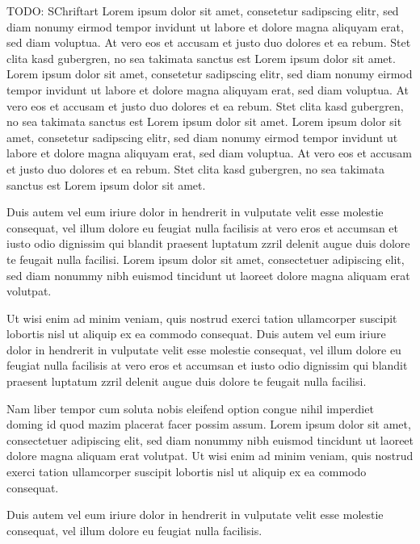 \documentclass[a4paper,
  ]{scrartcl}
\begin{document}


TODO: SChriftart
Lorem ipsum dolor sit amet, consetetur sadipscing elitr, sed diam nonumy eirmod tempor invidunt ut labore et dolore magna aliquyam erat, sed diam voluptua. At vero eos et accusam et justo duo dolores et ea rebum. Stet clita kasd gubergren, no sea takimata sanctus est Lorem ipsum dolor sit amet. Lorem ipsum dolor sit amet, consetetur sadipscing elitr, sed diam nonumy eirmod tempor invidunt ut labore et dolore magna aliquyam erat, sed diam voluptua. At vero eos et accusam et justo duo dolores et ea rebum. Stet clita kasd gubergren, no sea takimata sanctus est Lorem ipsum dolor sit amet. Lorem ipsum dolor sit amet, consetetur sadipscing elitr, sed diam nonumy eirmod tempor invidunt ut labore et dolore magna aliquyam erat, sed diam voluptua. At vero eos et accusam et justo duo dolores et ea rebum. Stet clita kasd gubergren, no sea takimata sanctus est Lorem ipsum dolor sit amet.

Duis autem vel eum iriure dolor in hendrerit in vulputate velit esse molestie consequat, vel illum dolore eu feugiat nulla facilisis at vero eros et accumsan et iusto odio dignissim qui blandit praesent luptatum zzril delenit augue duis dolore te feugait nulla facilisi. Lorem ipsum dolor sit amet, consectetuer adipiscing elit, sed diam nonummy nibh euismod tincidunt ut laoreet dolore magna aliquam erat volutpat.

Ut wisi enim ad minim veniam, quis nostrud exerci tation ullamcorper suscipit lobortis nisl ut aliquip ex ea commodo consequat. Duis autem vel eum iriure dolor in hendrerit in vulputate velit esse molestie consequat, vel illum dolore eu feugiat nulla facilisis at vero eros et accumsan et iusto odio dignissim qui blandit praesent luptatum zzril delenit augue duis dolore te feugait nulla facilisi.

Nam liber tempor cum soluta nobis eleifend option congue nihil imperdiet doming id quod mazim placerat facer possim assum. Lorem ipsum dolor sit amet, consectetuer adipiscing elit, sed diam nonummy nibh euismod tincidunt ut laoreet dolore magna aliquam erat volutpat. Ut wisi enim ad minim veniam, quis nostrud exerci tation ullamcorper suscipit lobortis nisl ut aliquip ex ea commodo consequat.

Duis autem vel eum iriure dolor in hendrerit in vulputate velit esse molestie consequat, vel illum dolore eu feugiat nulla facilisis.
\end{document}
